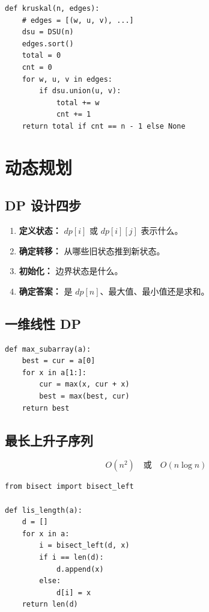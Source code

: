 \documentclass[UTF8,a4paper,14pt]{ctexart}
\begin{document}
\begin{lstlisting}
def kruskal(n, edges):
    # edges = [(w, u, v), ...]
    dsu = DSU(n)
    edges.sort()
    total = 0
    cnt = 0
    for w, u, v in edges:
        if dsu.union(u, v):
            total += w
            cnt += 1
    return total if cnt == n - 1 else None
\end{lstlisting}

\section{动态规划}

\subsection{DP 设计四步}

\begin{enumerate}
  \item \textbf{定义状态：} $dp[i]$ 或 $dp[i][j]$ 表示什么。
  \item \textbf{确定转移：} 从哪些旧状态推到新状态。
  \item \textbf{初始化：} 边界状态是什么。
  \item \textbf{确定答案：} 是 $dp[n]$、最大值、最小值还是求和。
\end{enumerate}

\subsection{一维线性 DP}

\begin{lstlisting}
def max_subarray(a):
    best = cur = a[0]
    for x in a[1:]:
        cur = max(x, cur + x)
        best = max(best, cur)
    return best
\end{lstlisting}

\subsection{最长上升子序列}

\[
O(n^2) \quad \text{或} \quad O(n\log n)
\]

\begin{lstlisting}
from bisect import bisect_left

def lis_length(a):
    d = []
    for x in a:
        i = bisect_left(d, x)
        if i == len(d):
            d.append(x)
        else:
            d[i] = x
    return len(d)
\end{lstlisting}
\end{document}
